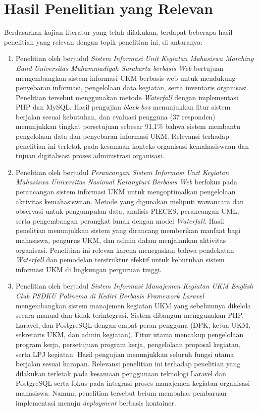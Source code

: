 \section{Hasil Penelitian yang Relevan}

Berdasarkan kajian literatur yang telah dilakukan, terdapat beberapa hasil penelitian yang relevan dengan topik penelitian ini, di antaranya:

\begin{enumerate}
  \item Penelitian oleh \citet{Pramitasari_Nurgiyatna_2019_UKMMarchingBand} berjudul \textit{Sistem Informasi Unit Kegiatan Mahasiswa Marching Band Universitas Muhammadiyah Surakarta berbasis Web} bertujuan mengembangkan sistem informasi UKM berbasis web untuk mendukung penyebaran informasi, pengelolaan data kegiatan, serta inventaris organisasi. Penelitian tersebut menggunakan metode \textit{Waterfall} dengan implementasi PHP dan MySQL. Hasil pengujian \textit{black box} menunjukkan fitur sistem berjalan sesuai kebutuhan, dan evaluasi pengguna (37 responden) menunjukkan tingkat persetujuan sebesar 91,1\% bahwa sistem membantu pengelolaan data dan penyebaran informasi UKM. Relevansi terhadap penelitian ini terletak pada kesamaan konteks organisasi kemahasiswaan dan tujuan digitalisasi proses administrasi organisasi.

  \item Penelitian oleh \citet{Widjaja_Prasojo_2022_UKMKarangturi} berjudul \textit{Perancangan Sistem Informasi Unit Kegiatan Mahasiswa Universitas Nasional Karangturi Berbasis Web} berfokus pada perancangan sistem informasi UKM untuk mengoptimalkan pengelolaan aktivitas kemahasiswaan. Metode yang digunakan meliputi wawancara dan observasi untuk pengumpulan data, analisis PIECES, perancangan UML, serta pengembangan perangkat lunak dengan model \textit{Waterfall}. Hasil penelitian menunjukkan sistem yang dirancang memberikan manfaat bagi mahasiswa, pengurus UKM, dan admin dalam menjalankan aktivitas organisasi. Penelitian ini relevan karena menegaskan bahwa pendekatan \textit{Waterfall} dan pemodelan terstruktur efektif untuk kebutuhan sistem informasi UKM di lingkungan perguruan tinggi.

  \item Penelitian oleh \citet{Tofani_Sukya_2023_UKMEnglishClub} berjudul \textit{Sistem Informasi Manajemen Kegiatan UKM English Club PSDKU Polinema di Kediri Berbasis Framework Laravel} mengembangkan sistem manajemen kegiatan UKM yang sebelumnya dikelola secara manual dan tidak terintegrasi. Sistem dibangun menggunakan PHP, Laravel, dan PostgreSQL dengan empat peran pengguna (DPK, ketua UKM, sekretaris UKM, dan admin kegiatan). Fitur utama mencakup pengelolaan program kerja, persetujuan program kerja, pengelolaan proposal kegiatan, serta LPJ kegiatan. Hasil pengujian menunjukkan seluruh fungsi utama berjalan sesuai harapan. Relevansi penelitian ini terhadap penelitian yang dilakukan terletak pada kesamaan penggunaan teknologi Laravel dan PostgreSQL serta fokus pada integrasi proses manajemen kegiatan organisasi mahasiswa. Namun, penelitian tersebut belum membahas pembaruan implementasi menuju \textit{deployment} berbasis kontainer.


\end{enumerate}
